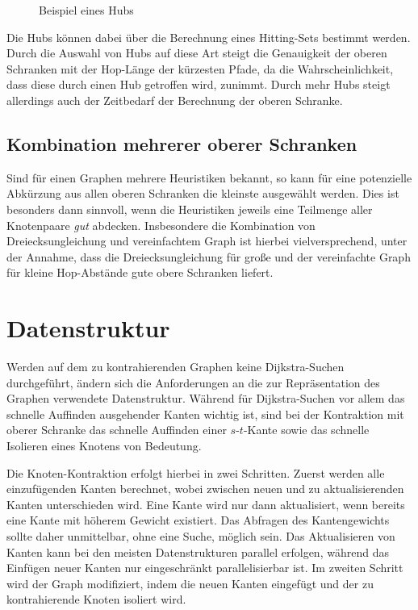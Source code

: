 \begin{figure}[h!]
  \centering

  \caption{Beispiel eines Hubs}
\end{figure}

Die Hubs können dabei über die Berechnung eines Hitting-Sets bestimmt werden.
Durch die Auswahl von Hubs auf diese Art steigt die Genauigkeit der oberen Schranken mit der Hop-Länge der kürzesten Pfade, da die Wahrscheinlichkeit, dass diese durch einen Hub getroffen wird, zunimmt.
Durch mehr Hubs steigt allerdings auch der Zeitbedarf der Berechnung der oberen Schranke.

\subsection{Kombination mehrerer oberer Schranken}
Sind für einen Graphen mehrere Heuristiken bekannt, so kann für eine potenzielle Abkürzung aus allen oberen Schranken die kleinste ausgewählt werden.
Dies ist besonders dann sinnvoll, wenn die Heuristiken jeweils eine Teilmenge aller Knotenpaare \emph{gut} abdecken.
Insbesondere die Kombination von Dreiecksungleichung und vereinfachtem Graph ist hierbei vielversprechend, unter der Annahme, dass die Dreiecksungleichung für große und der vereinfachte Graph für kleine Hop-Abstände gute obere Schranken liefert.

\section{Datenstruktur}

Werden auf dem zu kontrahierenden Graphen keine Dijkstra-Suchen durchgeführt, ändern sich die Anforderungen an die zur Repräsentation des Graphen verwendete Datenstruktur.
Während für Dijkstra-Suchen vor allem das schnelle Auffinden ausgehender Kanten wichtig ist, sind bei der Kontraktion mit oberer Schranke das schnelle Auffinden einer $s$-$t$-Kante sowie das schnelle Isolieren eines Knotens von Bedeutung.

Die Knoten-Kontraktion erfolgt hierbei in zwei Schritten.
Zuerst werden alle einzufügenden Kanten berechnet, wobei zwischen neuen und zu aktualisierenden Kanten unterschieden wird.
Eine Kante wird nur dann aktualisiert, wenn bereits eine Kante mit höherem Gewicht existiert.
Das Abfragen des Kantengewichts sollte daher unmittelbar, ohne eine Suche, möglich sein.
Das Aktualisieren von Kanten kann bei den meisten Datenstrukturen parallel erfolgen, während das Einfügen neuer Kanten nur eingeschränkt parallelisierbar ist.
Im zweiten Schritt wird der Graph modifiziert, indem die neuen Kanten eingefügt und der zu kontrahierende Knoten isoliert wird.

